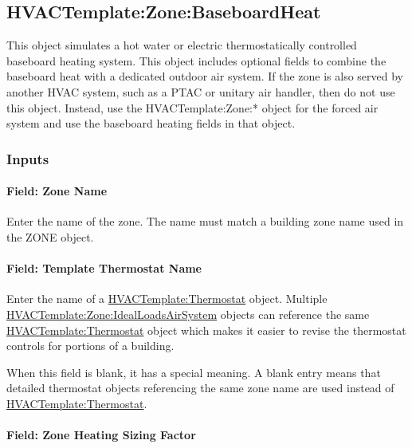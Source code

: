 \subsection{HVACTemplate:Zone:BaseboardHeat}\label{hvactemplatezonebaseboardheat}

This object simulates a hot water or electric thermostatically controlled baseboard heating system. This object includes optional fields to combine the baseboard heat with a dedicated outdoor air system. If the zone is also served by another HVAC system, such as a PTAC or unitary air handler, then do not use this object. Instead, use the HVACTemplate:Zone:* object for the forced air system and use the baseboard heating fields in that object.

\subsubsection{Inputs}\label{inputs-2-020}

\paragraph{Field: Zone Name}\label{field-zone-name-1-004}

Enter the name of the zone. The name must match a building zone name used in the ZONE object.

\paragraph{Field: Template Thermostat Name}\label{field-template-thermostat-name-1}

Enter the name of a \hyperref[hvactemplatethermostat]{HVACTemplate:Thermostat} object. Multiple \hyperref[hvactemplatezoneidealloadsairsystem]{HVACTemplate:Zone:IdealLoadsAirSystem} objects can reference the same \hyperref[hvactemplatethermostat]{HVACTemplate:Thermostat} object which makes it easier to revise the thermostat controls for portions of a building.

When this field is blank, it has a special meaning. A blank entry means that detailed thermostat objects referencing the same zone name are used instead of \hyperref[hvactemplatethermostat]{HVACTemplate:Thermostat}.

\paragraph{Field: Zone Heating Sizing Factor}\label{field-zone-heating-sizing-factor-000}

